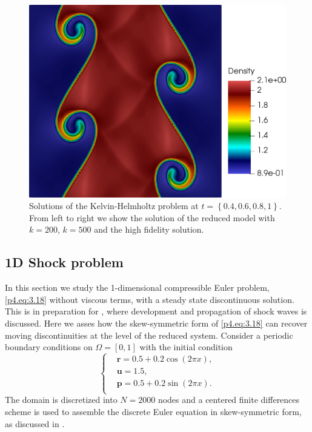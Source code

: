\begin{figure}[h!]
\includegraphics[scale=0.115]{data/Compressible_Euler/KH/Snapshots/density_exact_768.png}

\caption{Solutions of the Kelvin-Helmholtz problem at $t=\left\{ 0.4, 0.6, 0.8, 1 \right\}$. From left to right we show the solution of the reduced model with $k=200$, $k=500$ and the high fidelity solution.}
\label{p4.fig:snap_solution_KH}
\end{figure}


\subsection{1D Shock problem} \label{sec:p4.res.3}
In this section we study the 1-dimensional compressible Euler problem, \eqref{p4.eq:3.18} without viscous terms, with a steady state discontinuous solution. This is in preparation for , where development and propagation of shock waves is discussed. Here we asses how the skew-symmetric form of \eqref{p4.eq:3.18} can recover moving discontinuities at the level of the reduced system. Consider a periodic boundary conditions on $\Omega = [0,1]$ with the initial condition
\begin{equation*}
\begin{cases}
& \mathbf{r} = 0.5+0.2 \cos(2\pi x),\\
& \mathbf{u} = 1.5,\\
& \mathbf{p} = 0.5+0.2 \sin(2\pi x).\\
\end{cases}
\end{equation*}
The domain is discretized into $N=2000$ nodes and a centered finite differences scheme is used to assemble the discrete Euler equation in skew-symmetric form, as discussed in . 

